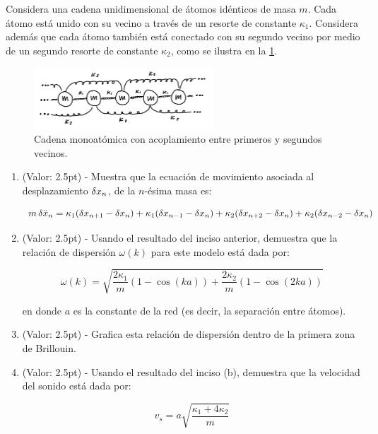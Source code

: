 \documentclass[./../main.tex]{subfiles}
\begin{document}
    \begin{exercise}
        Considera una cadena unidimensional de átomos idénticos de masa \(m\). Cada átomo está unido con su vecino a través de un resorte de constante \(\kappa_{1}\). Considera además que cada átomo también está conectado con su segundo vecino por medio de un segundo resorte de constante \(\kappa_{2}\), como se ilustra en la \cref{fig:monoatomicChain}.

        \begin{figure}[htb]
            \centering
            \includegraphics[width=0.6\textwidth]{monatomic-chain}
            \caption{Cadena monoatómica con acoplamiento entre primeros y segundos vecinos.}
            \label{fig:monoatomicChain}
        \end{figure}

        \begin{enumerate}
            \item (Valor: 2.5pt) - Muestra que la ecuación de movimiento asociada al desplazamiento \(\fdif{x_{n}}\), de la \(n\)-ésima masa es:
            
            \begin{equation*}
                m\fdif{\ddot{x}_{n}} = \kappa_{1}(\fdif{x_{n + 1}} - \fdif{x_{n}}) + \kappa_{1}(\fdif{x_{n - 1}} - \fdif{x_{n}}) + \kappa_{2}(\fdif{x_{n + 2}} - \fdif{x_{n}}) + \kappa_{2}(\fdif{x_{n - 2}} - \fdif{x_{n}})
            \end{equation*}

            \item (Valor: 2.5pt) - Usando el resultado del inciso anterior, demuestra que la relación de dispersión \(\omega(k)\) para este modelo está dada por:
            
            \begin{equation*}
                \omega(k) = \sqrt{\dfrac{2\kappa_{1}}{m}(1 - \cos(ka)) + \dfrac{2\kappa_{2}}{m}(1 - \cos(2ka))}
            \end{equation*}

            en donde \(a\) es la constante de la red (es decir, la separación entre átomos).

            \item (Valor: 2.5pt) - Grafica esta relación de dispersión dentro de la primera zona de Brillouin.
            \item (Valor: 2.5pt) - Usando el resultado del inciso (b), demuestra que la velocidad del sonido está dada por:
            
            \begin{equation*}
                v_{s} = a\sqrt{\dfrac{\kappa_{1} + 4\kappa_{2}}{m}}
            \end{equation*}
        \end{enumerate}
    \end{exercise}
\end{document}
